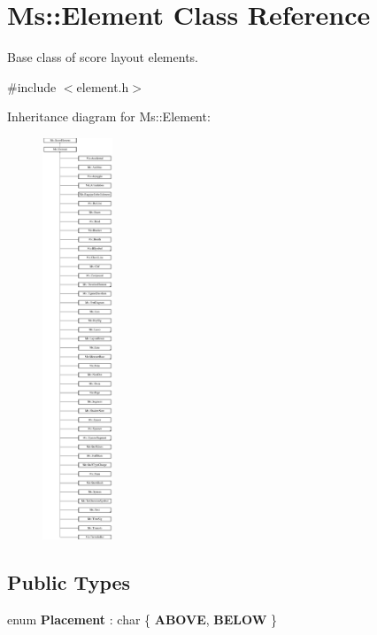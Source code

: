 \hypertarget{class_ms_1_1_element}{}\section{Ms\+:\+:Element Class Reference}
\label{class_ms_1_1_element}


Base class of score layout elements.  




{\ttfamily \#include $<$element.\+h$>$}

Inheritance diagram for Ms\+:\+:Element\+:\begin{figure}[H]
\begin{center}
\leavevmode
\includegraphics[height=12.000000cm]{class_ms_1_1_element}
\end{center}
\end{figure}
\subsection*{Public Types}
\begin{DoxyCompactItemize}
\item 
\mbox{\label{class_ms_1_1_element_a1c16c977d6ad375dd159d459370deecb}} 
enum {\bfseries Placement} \+: char \{ {\bfseries A\+B\+O\+VE}, 
{\bfseries B\+E\+L\+OW}
 \}
\end{DoxyCompactItemize}
